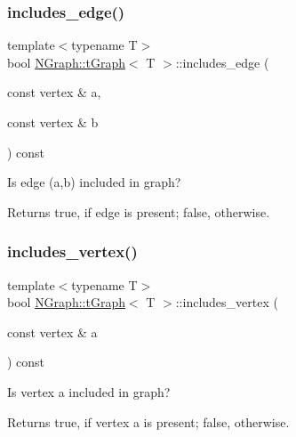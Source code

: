 \subsubsection{\texorpdfstring{includes\+\_\+edge()}{includes\_edge()}}
{\footnotesize\ttfamily template$<$typename T$>$ \\
bool \mbox{\hyperlink{class_n_graph_1_1t_graph}{N\+Graph\+::t\+Graph}}$<$ T $>$\+::includes\+\_\+edge (\begin{DoxyParamCaption}\item[{const vertex \&}]{a,  }\item[{const vertex \&}]{b }\end{DoxyParamCaption}) const\hspace{0.3cm}{\ttfamily [inline]}}

Is edge (a,b) included in graph?

\begin{DoxyReturn}{Returns}
true, if edge is present; false, otherwise. 
\end{DoxyReturn}
\mbox{\label{class_n_graph_1_1t_graph_a260849918a2806a4a9aa1cfad0471e41}} 
\subsubsection{\texorpdfstring{includes\+\_\+vertex()}{includes\_vertex()}}
{\footnotesize\ttfamily template$<$typename T$>$ \\
bool \mbox{\hyperlink{class_n_graph_1_1t_graph}{N\+Graph\+::t\+Graph}}$<$ T $>$\+::includes\+\_\+vertex (\begin{DoxyParamCaption}\item[{const vertex \&}]{a }\end{DoxyParamCaption}) const\hspace{0.3cm}{\ttfamily [inline]}}

Is vertex \textquotesingle{}a\textquotesingle{} included in graph?

\begin{DoxyReturn}{Returns}
true, if vertex a is present; false, otherwise. 
\end{DoxyReturn}
\mbox{\label{class_n_graph_1_1t_graph_a826e79cbe8d540de7f044c6ae841dd5f}} 
